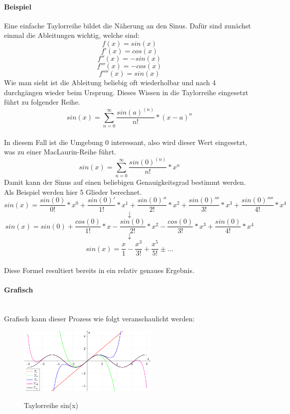 \documentclass{school}
\begin{document}
\paragraph{Beispiel}
Eine einfache Taylorreihe bildet die N\"aherung an den Sinus. Daf\"ur sind zun\"achst einmal die Ableitungen wichtig, welche sind:
$$f(x) = sin(x)$$
$$f'(x) = cos(x)$$
$$f''(x) = -sin(x)$$
$$f'''(x) = -cos(x)$$
$$f''''(x) = sin(x)$$
Wie man sieht ist die Ableitung beliebig oft wiederholbar und nach 4 durchg\"angen wieder beim Ursprung. Dieses Wissen in die Taylorreihe eingesetzt f\"uhrt zu folgender Reihe.
$$sin(x)=\sum_{n=0}^\infty \frac{sin(a)^{(n)}}{n!}*(x-a)^n$$
\newpage~\\
In diesem Fall ist die Umgebung $0$ interessant, also wird dieser Wert eingesetzt, was zu einer MacLaurin-Reihe f\"uhrt.
$$sin(x)=\sum_{n=0}^\infty \frac{sin(0)^{(n)}}{n!}*x^n$$
Damit kann der Sinus auf einen beliebigen Genauigkeitsgrad bestimmt werden.\\
Als Beispiel werden hier 5 Glieder berechnet.
$$sin(x)=\frac{sin(0)}{0!}*x^0 + \frac{sin(0)'}{1!}*x^1 + \frac{sin(0)''}{2!}*x^2 + \frac{sin(0)'''}{3!}*x^3 + \frac{sin(0)''''}{4!}*x^4$$
$$\downarrow$$
$$sin(x)=sin(0) + \frac{cos(0)}{1!}*x - \frac{sin(0)}{2!}*x^2 - \frac{cos(0)}{3!}*x^3 + \frac{sin(0)}{4!}*x^4$$
$$\downarrow$$
$$sin(x)=\frac{x}{1} - \frac{x^3}{3!} + \frac{x^5}{5!} \pm ...$$
\\
Diese Formel resultiert bereits in ein relativ genaues Ergebnis.

\paragraph{Grafisch} ~\\ Grafisch kann dieser Prozess wie folgt veranschaulicht werden:
\begin{figure}[hh]
\centering
\includegraphics[width=0.6\textwidth]{sinx-taylor.png}\\
\caption[https://de.wikipedia.org/wiki/Datei:Taylorpolynom-sin.svg]{Taylorreihe sin(x)}
\end{figure}

\newpage
\end{document}
